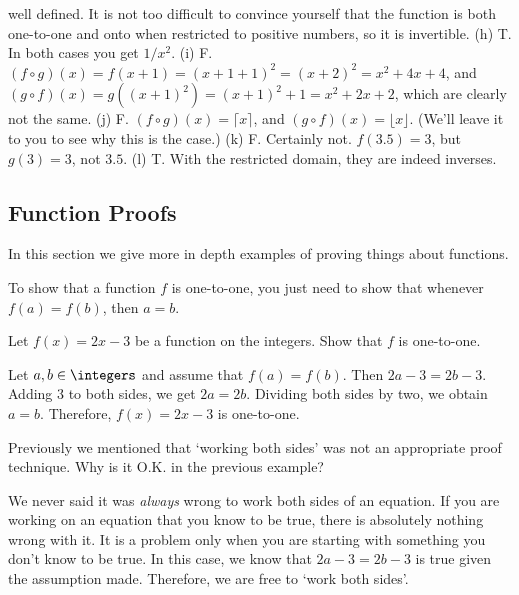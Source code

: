 \begin{exer}
\begin{answer}
well defined.  It is not too difficult to convince yourself that the function is both one-to-one and onto
when restricted to positive numbers, so it is invertible.
(h) T.  In both cases you get $1/x^2$.
(i) F.  $(f\circ g)(x)=f(x+1)=(x+1+1)^2=(x+2)^2=x^2+4x+4$, and $(g\circ f)(x)=g((x+1)^2)=(x+1)^2+1=x^2+2x+2$,
which are clearly not the same.
(j) F. $(f\circ g)(x)=\lceil x\rceil$, and $(g\circ f)(x)=\lfloor x\rfloor$. 
(We'll leave it to you to see why this is the case.)
(k) F.  Certainly not.  $f(3.5)=3$, but $g(3)=3$, not $3.5$.
(l) T. With the restricted domain, they are indeed inverses.
\end{answer}
\end{exer}


\newpage
\subsection{Function Proofs}\label{section:functionProofs}

In this section we give more in depth examples
of proving things about functions.

\begin{proc}
To show that a function $f$ is one-to-one, you just need to show that whenever $f(a)=f(b)$, then $a=b$.
\end{proc}

\begin{exa}
Let $f(x)=2x-3$ be a function on the integers.  Show that $f$ is one-to-one.
\begin{sol}  
Let $a,b\in\integers$ and assume that $f(a)=f(b)$.  Then $2a-3=2b-3$.  Adding $3$
to both sides, we get $2a=2b$.  Dividing both sides by two, we obtain $a=b$.  Therefore, $f(x)=2x-3$
is one-to-one.
\end{sol}
\end{exa}

\begin{ques}
Previously we mentioned that `working both sides' was not an appropriate proof technique.
Why is it O.K. in the previous example?

\noindent
\answerlinetwo
\begin{answer}
We never said it was {\em always} wrong to work both sides of an equation.  If you are working
on an equation that you know to be true, there is absolutely nothing wrong with it.
It is a problem only when you are starting with something you don't know to be true.
In this case, we know that $2a-3=2b-3$ is true given the assumption made.  Therefore, we are
free to `work both sides'.
\end{answer}
\end{ques}

